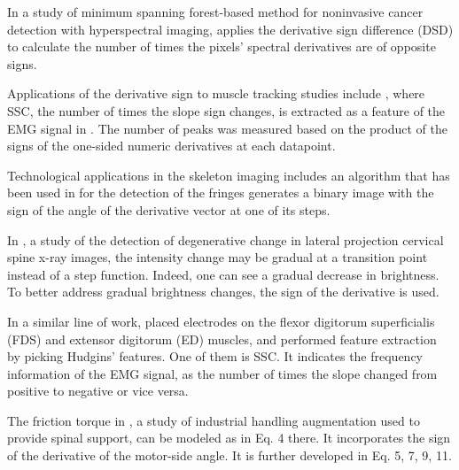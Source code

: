 \documentclass[11pt]{book}
\begin{document}
In a study of minimum spanning forest-based method for noninvasive cancer
detection with hyperspectral imaging, \cite{pike2015minimum} applies the derivative
sign difference (DSD) to calculate the number of times the pixels'
spectral derivatives are of opposite signs.

Applications of the derivative sign to muscle tracking studies include \cite{luppescuclassification,waris2018effect,wahid2018subject,cengiz2020detection,fajardo2021emg},
where SSC, the number of times the slope sign changes, is extracted
as a feature of the EMG signal in . The number of peaks was measured
based on the product of the signs of the one-sided numeric derivatives
at each datapoint.

Technological applications in the skeleton imaging includes an algorithm that has been used in \cite{rodriguez2004plane} for
the detection of the fringes generates a binary image with the sign
of the angle of the derivative vector at one of its steps. 

In \cite{jebri2015detection}, a study of the detection of degenerative change in lateral projection cervical spine
x-ray images,
the intensity change may be gradual at a transition point instead
of a step function. Indeed, one can see a gradual decrease in brightness.
To better address gradual brightness changes, the sign of the derivative
is used. 

In a similar line of work, \cite{shi2018bionic} placed electrodes on
the flexor digitorum superficialis (FDS) and extensor digitorum (ED)
muscles, and performed feature extraction by picking Hudgins' features.
One of them is SSC. It indicates the frequency information of the
EMG signal, as the number of times the slope changed from positive
to negative or vice versa. 

The friction torque in \cite{zhang2018lower}, a study of industrial handling
augmentation used to provide spinal support,
can be modeled as in Eq. 4 there. It incorporates the sign of the
derivative of the motor-side angle. It is further developed in Eq.
5, 7, 9, 11.
\end{document}
